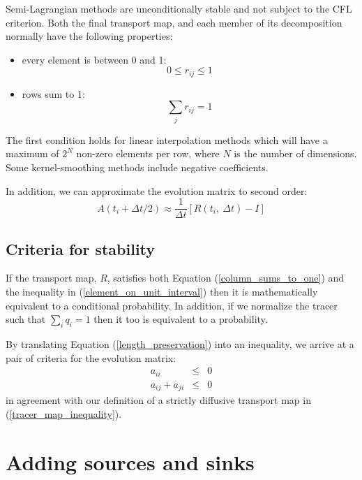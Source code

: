 \documentclass[11pt]{article}
\begin{document}
Semi-Lagrangian methods are unconditionally stable and not subject to the
CFL criterion.
Both the final transport map, and each member of its decomposition normally have
the following properties:
\begin{itemize}
\item every element is between 0 and 1:
\begin{equation}
0 \le r_{ij} \le 1
\label{element_on_unit_interval}
\end{equation}
\item rows sum to 1:
\begin{equation}
\sum_j r_{ij} = 1
\label{rowssumtoone}
\end{equation}
\end{itemize}
The first condition holds for linear interpolation methods which will have
a maximum of $2^N$ non-zero elements per row, 
where $N$ is the number of dimensions. 
Some kernel-smoothing methods include negative coefficients.

In addition, we can approximate the evolution matrix to second order:
\begin{equation}
A(t_i+\Delta t/2) \approx \frac{1}{\Delta t} \left [R(t_i,~\Delta t) - I \right ]
\end{equation}

\subsection{Criteria for stability}

If the transport map, $R$, satisfies both Equation (\ref{column_sums_to_one})
and the inequality in (\ref{element_on_unit_interval}) then it is mathematically
equivalent to a conditional probability.
In addition, if we normalize the tracer such that $\sum_i q_i=1$
then it too is equivalent to a probability.

By translating Equation (\ref{length_preservation}) into an inequality, 
we arrive at a pair of criteria for the evolution matrix:
\begin{eqnarray}
a_{ii} & \le & 0 \\
a_{ij}+a_{ji} & \le & 0
\end{eqnarray}
in agreement with our definition of a strictly diffusive transport map in
(\ref{tracer_map_inequality}). 


\section{Adding sources and sinks}
\end{document}
